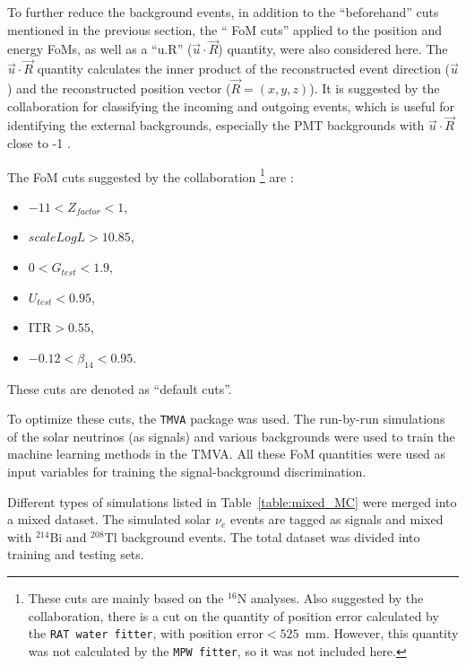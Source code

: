 To further reduce the background events, in addition to the ``beforehand'' cuts mentioned in the previous section, the `` FoM cuts'' applied to the position and energy FoMs, as well as a ``u.R'' ($\vec{u}\cdot \vec{R}$) quantity, were also considered here. The $\vec{u}\cdot \vec{R}$ quantity calculates the inner product of the reconstructed event direction ($\vec{u}$) and the reconstructed position vector ($\vec{R}=(x,y,z)$). It is suggested by the collaboration for classifying the incoming and outgoing events, which is useful for identifying the external backgrounds, especially the PMT backgrounds with $\vec{u}\cdot \vec{R}$ close to -1 \cite{waterunidoc}.

The FoM cuts suggested by the collaboration \footnote{These cuts are mainly based on the $^{16}$N analyses. Also suggested by the collaboration, there is a cut on the quantity of position error calculated by the \texttt{RAT water fitter}, with position error$<525$~mm. However, this quantity was not calculated by the \texttt{MPW fitter}, so it was not included here.} are \cite{morganFOM}: 
\begin{itemize}
    \item $-11<Z_{factor}<1$\;, 
    \item $scaleLogL>10.85$\;,
    \item $0<G_{test}<1.9$\;,
    \item $U_{test}<0.95$\;,
    \item $\mathrm{ITR}>0.55$\;,
    \item $-0.12<\beta_{14}<0.95$\;.
\end{itemize}
These cuts are denoted as ``default cuts''.

To optimize these cuts, the \texttt{TMVA} package was used. The run-by-run simulations of the solar neutrinos (as signals) and various backgrounds were used to train the machine learning methods in the TMVA. All these FoM quantities were used as input variables for training the signal-background discrimination.

Different types of simulations listed in Table~\ref{table:mixed_MC} were merged into a mixed dataset. The simulated solar $\nu_e$ events are tagged as signals and mixed with $^{214}$Bi and $^{208}$Tl background events. The total dataset was divided into training and testing sets. 

